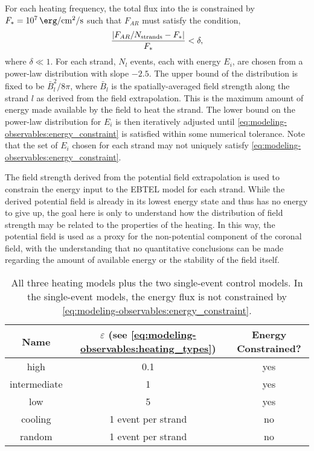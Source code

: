 For each heating frequency, the total flux into the \AR{} is constrained by $F_{\ast}=\SI{e7}{\erg\per\square\cm\per\second}$ \citep{withbroe_mass_1977} such that $F_{AR}$ must satisfy the condition,
\begin{equation}\label{eq:modeling-observables:energy_constraint}
    \frac{| F_{AR}/N_\textup{strands} - F_{\ast} |}{F_{\ast}} < \delta,
\end{equation}
where $\delta\ll1$. For each strand, $N_l$ events, each with energy $E_i$, are chosen from a power-law distribution with slope $-2.5$. The upper bound of the distribution is fixed to be $\bar{B}_l^2/8\pi$, where $\bar{B}_l$ is the spatially-averaged field strength along the strand $l$ as derived from the field extrapolation. This is the maximum amount of energy made available by the field to heat the strand. The lower bound on the power-law distribution for $E_i$ is then iteratively adjusted until \autoref{eq:modeling-observables:energy_constraint} is satisfied within some numerical tolerance. Note that the set of $E_i$ chosen for each strand may not uniquely satisfy \autoref{eq:modeling-observables:energy_constraint}.

The field strength derived from the potential field extrapolation is used to constrain the energy input to the EBTEL model for each strand. While the derived potential field is already in its lowest energy state and thus has no energy to give up, the goal here is only to understand how the distribution of field strength may be related to the properties of the heating. In this way, the potential field is used as a proxy for the non-potential component of the coronal field, with the understanding that no quantitative conclusions can be made regarding the amount of available energy or the stability of the field itself.

\begin{table}
    \centering
    \caption{All three heating models plus the two single-event control models. In the single-event models, the energy flux is not constrained by \autoref{eq:modeling-observables:energy_constraint}.\label{tab:modeling-observables:heating}}
    \begin{tabularx}{\columnwidth}{CCC}
        \toprule
        Name & $\varepsilon$ (see \autoref{eq:modeling-observables:heating_types}) & Energy Constrained? \\
        \midrule
        high & 0.1 & yes \\
        intermediate & 1 & yes \\
        low & 5 & yes \\
        cooling & 1 event per strand & no \\
        random & 1 event per strand & no \\
        \bottomrule
    \end{tabularx}
\end{table}


